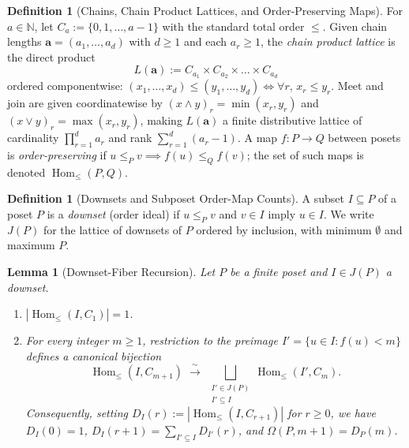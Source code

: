 \documentclass[11pt,a4paper]{article}
\newcommand{\coloneqq}{\mathrel{:=}}
\newtheorem{lemma}[theorem]{Lemma}
\theoremstyle{definition}
\newtheorem{definition}[theorem]{Definition}
\newcommand{\Homle}{\operatorname{Hom}_{\le}}
\begin{document}
\begin{definition}[Chains, Chain Product Lattices, and Order-Preserving Maps]
For $a \in \mathbb{N}$, let $C_a \coloneqq \{0, 1, \dots, a-1\}$ with the standard total order
$\le$. Given chain lengths $\mathbf{a} = (a_1, \dots, a_d)$ with $d \ge 1$ and each $a_r \ge 1$, the
\emph{chain product lattice} is the direct product
\[
  L(\mathbf{a}) \coloneqq C_{a_1} \times C_{a_2} \times \dots \times C_{a_d}
\]
ordered componentwise: $(x_1, \dots, x_d) \le (y_1, \dots, y_d) \iff \forall r,\, x_r \le y_r$.
Meet and join are given coordinatewise by $(x \wedge y)_r = \min(x_r, y_r)$ and
$(x \vee y)_r = \max(x_r, y_r)$, making $L(\mathbf{a})$ a finite distributive lattice of
cardinality $\prod_{r=1}^d a_r$ and rank $\sum_{r=1}^d (a_r - 1)$. A map $f : P \to Q$ between
posets is \emph{order-preserving} if $u \le_P v \implies f(u) \le_Q f(v)$; the set of such maps is
denoted $\Homle(P, Q)$.
\end{definition}

\begin{definition}[Downsets and Subposet Order-Map Counts]
A subset $I \subseteq P$ of a poset $P$ is a \emph{downset} (order ideal) if $u \le_P v$ and
$v \in I$ imply $u \in I$. We write $J(P)$ for the lattice of downsets of $P$ ordered by inclusion,
with minimum $\emptyset$ and maximum $P$.
\end{definition}

\begin{lemma}[Downset-Fiber Recursion]\label{lem:downset-rec}
Let $P$ be a finite poset and $I \in J(P)$ a downset.
\begin{enumerate}
  \item[(a)] $|\Homle(I, C_1)| = 1$.
  \item[(b)] For every integer $m \ge 1$, restriction to the preimage $I' = \{u \in I : f(u) < m\}$
        defines a canonical bijection
        \[
          \Homle(I, C_{m+1}) \;\xrightarrow{\;\sim\;}\;
          \bigsqcup_{\substack{I' \in J(P) \\ I' \subseteq I}} \Homle(I', C_m).
        \]
        Consequently, setting $D_I(r) \coloneqq |\Homle(I, C_{r+1})|$ for $r \ge 0$, we have
        $D_I(0) = 1$, $D_I(r+1) = \sum_{I' \subseteq I} D_{I'}(r)$, and $\Omega(P, m+1) = D_P(m)$.
\end{enumerate}
\end{lemma}
\end{document}

